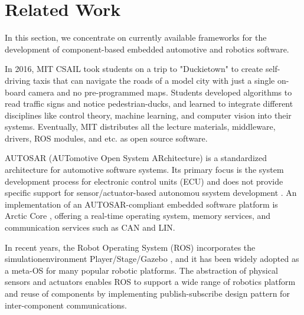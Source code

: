 \clearpage
{}


\newpage
{}
\chapter{Related Work}
\pagestyle{plain}

\begin{spacing}{2.0}

In this section, we concentrate on currently available frameworks for the development of component-based embedded automotive and robotics software.

In 2016, MIT CSAIL took students on a trip to "Duckietown" \cite{Duckietown} to create self-driving taxis that can navigate the roads of a model city with just a single on-board camera and no pre-programmed maps. Students developed algorithms to read traffic signs and notice pedestrian-ducks, and learned to integrate different disciplines like control theory, machine learning, and computer vision into their systems. Eventually, MIT distributes all the lecture materials, middleware, drivers, ROS modules, and etc. as open source software.

AUTOSAR (AUTomotive Open System ARchitecture) is a standardized architecture for automotive software systems. Its primary focus is the system development process for electronic control units (ECU) and does not provide specific support for sensor/actuator-based autonomou ssystem development \cite{rtes}. An implementation of an AUTOSAR-compliant embedded software platform is Arctic Core \cite{arctic-core}, offering a real-time operating system, memory services, and communication services such as CAN and LIN.

In recent years, the Robot Operating System (ROS) \cite{ROS} incorporates the simulationenvironment Player/Stage/Gazebo \cite{player/stage}, and it has been widely adopted as a meta-OS for many popular robotic platforms. The abstraction of physical sensors and actuators enables ROS to support a wide range of robotics platform and reuse of components by implementing publish-subscribe design pattern for inter-component communications.

\end{spacing}

\clearpage
{}

\newpage
{}
